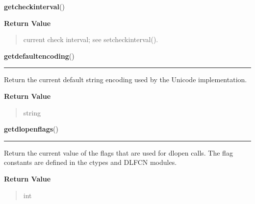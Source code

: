 \hspace{.8\funcindent}\begin{boxedminipage}{\funcwidth}

    \raggedright \textbf{getcheckinterval}()

\setlength{\parskip}{2ex}
\setlength{\parskip}{1ex}
      \textbf{Return Value}
    \vspace{-1ex}

      \begin{quote}
      current check interval; see setcheckinterval().

      \end{quote}

    \end{boxedminipage}

    \label{sys:getdefaultencoding}

    \vspace{0.5ex}

\hspace{.8\funcindent}\begin{boxedminipage}{\funcwidth}

    \raggedright \textbf{getdefaultencoding}()

    \vspace{-1.5ex}

    \rule{\textwidth}{0.5\fboxrule}
\setlength{\parskip}{2ex}
    Return the current default string encoding used by the Unicode 
    implementation.

\setlength{\parskip}{1ex}
      \textbf{Return Value}
    \vspace{-1ex}

      \begin{quote}
      string

      \end{quote}

    \end{boxedminipage}

    \label{sys:getdlopenflags}

    \vspace{0.5ex}

\hspace{.8\funcindent}\begin{boxedminipage}{\funcwidth}

    \raggedright \textbf{getdlopenflags}()

    \vspace{-1.5ex}

    \rule{\textwidth}{0.5\fboxrule}
\setlength{\parskip}{2ex}
    Return the current value of the flags that are used for dlopen calls. 
    The flag constants are defined in the ctypes and DLFCN modules.

\setlength{\parskip}{1ex}
      \textbf{Return Value}
    \vspace{-1ex}

      \begin{quote}
      int

      \end{quote}

    \end{boxedminipage}


